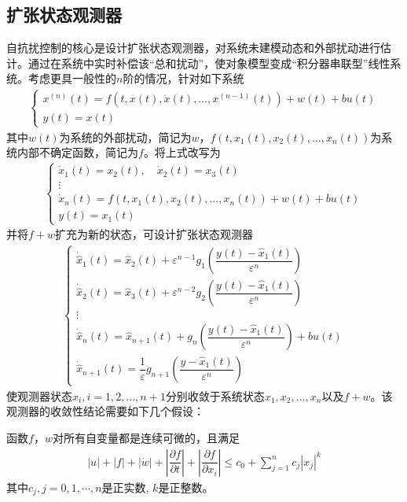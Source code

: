 \subsection{扩张状态观测器}
自抗扰控制的核心是设计扩张状态观测器，对系统未建模动态和外部扰动进行估计。通过在系统中实时补偿该“总和扰动”，使对象模型变成“积分器串联型”线性系统。考虑更具一般性的$ n $阶的情况，针对如下系统
\begin{align}\left\{\begin{array}{l}
x^{(n)}(t)=f\left(t, x(t), \dot{x}(t), \ldots, x^{(n-1)}(t)\right)+w(t)+bu(t) \\
y(t)=x(t)
\end{array}\right.	\label{eq_sys}
\end{align}
其中$ w(t) $为系统的外部扰动，简记为$ w $，$ f\left(t, x_{1}(t), x_{2}(t), \ldots, x_{n}(t)\right) $为系统内部不确定函数，简记为$ f $。将上式改写为
\begin{align}\left\{\begin{array}{l}
\dot{x}_{1}(t)=x_{2}(t),\quad
\dot{x}_{2}(t)=x_{3}(t)  \\
\vdots \\
\dot{x}_{n}(t)=f\left(t, x_{1}(t), x_{2}(t), \ldots, x_{n}(t)\right) +w(t)+bu(t)	\\
y(t)=x_{1}(t)
\end{array}\right.	\label{eq_n_diff}
\end{align}
并将$ f+w $扩充为新的状态，可设计扩张状态观测器\cite{Guo_2012}
\begin{align}\left\{\begin{array}{l}
\dot{\hat{x}}_{1}(t)=\hat{x}_{2}(t)+\varepsilon^{n-1} g_{1}\left(\dfrac{y(t)-\hat{x}_{1}(t)}{\varepsilon^{n}}\right)\\[3mm]
\dot{\hat{x}}_{2}(t)=\hat{x}_{3}(t)+\varepsilon^{n-2} g_{2}\left(\dfrac{y(t)-\hat{x}_{1}(t)}{\varepsilon^{n}}\right) \\
\vdots \\
\dot{\hat{x}}_{n}(t)=\hat{x}_{n+1}(t)+g_{n}\left(\dfrac{y(t)-\hat{x}_{1}(t)}{\varepsilon^{n}}\right)+bu(t) \\[3mm]
\dot{\hat{x}}_{n+1}(t)=\dfrac{1}{\varepsilon} g_{n+1}\left(\dfrac{y-\hat{x}_{1}(t)}{\varepsilon^{n}}\right)
\end{array}\right.  	\label{eq_NLESO}
\end{align}
使观测器状态$ \hat{x}_i,i=1,2,\dots,n+1 $分别收敛于系统状态$ x_1,x_2,\dots,x_n $以及$ f+w $。该观测器的收敛性结论需要如下几个假设\cite{Guo_2012,Guo_2011}：
\begin{assumption}
	函数$ f $，$ w $对所有自变量都是连续可微的，且满足
	\begin{align}|u|+|f|+|\dot{w}|+\left|\dfrac{\partial f}{\partial t}\right|+\left|\dfrac{\partial f}{\partial x_{i}}\right| \leq c_{0}+\sum_{j=1}^{n} c_{j}\left|x_{j}\right|^{k}\end{align}
	其中$c_{j}, j=0,1, \cdots, n$是正实数, $ k $是正整数。	\label{H1}
\end{assumption}	
